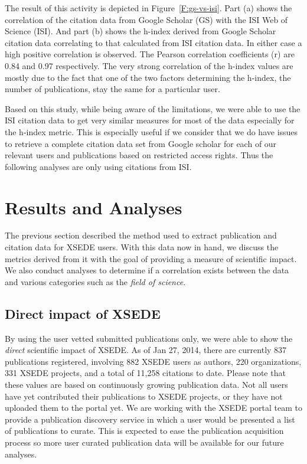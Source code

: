 \documentclass{sig-alternate}
\begin{document}
The result of this activity is depicted in
Figure~\ref{F:gs-vs-isi}. Part (a) shows the correlation of the
citation data from Google Scholar (GS) with the ISI Web of Science
(ISI). And part (b) shows the h-index derived from Google Scholar
citation data correlating to that calculated from ISI citation
data. In either case a high positive correlation is observed. The
Pearson correlation coefficients (r) are 0.84 and 0.97
respectively. The very strong correlation of the h-index values are
mostly due to the fact that one of the two factors determining the
h-index, the number of publications, stay the same for a particular
user.

Based on this study, while being aware of the limitations, we were
able to use the ISI citation data to get very similar measures for
most of the data especially for the h-index metric. This is especially
useful if we consider that we do have issues to retrieve a complete
citation data set from Google scholar for each of our relevant users
and publications based on restricted access rights. Thus the following
analyses are only using citations from ISI.


\section{Results and Analyses} \label{S:result}

The previous section described the method used to extract publication
and citation data for XSEDE users.  With this data now in hand, we
discuss the metrics derived from it with the goal of providing
a measure of scientific impact. We also conduct analyses to
determine if a correlation exists between the data and various
categories such as the {\em field of science}.
 
\subsection{Direct impact of XSEDE} 
 
By using the user vetted submitted publications only, we were able to
show the \emph{direct} scientific impact of XSEDE.  As of Jan 27,
2014, there are currently 837 publications registered, involving 882
XSEDE users as authors, 220 organizations, 331 XSEDE projects, and a
total of 11,258 citations to date. Please note that these values are
based on continuously growing publication data. Not all users have yet
contributed their publications to XSEDE projects, or they have not
uploaded them to the portal yet. We are working with the XSEDE portal
team to provide a publication discovery service in which a user would
be presented a list of publications to curate. This is expected to
ease the publication acquisition process so more user curated
publication data will be available for our future analyses.
\end{document}
